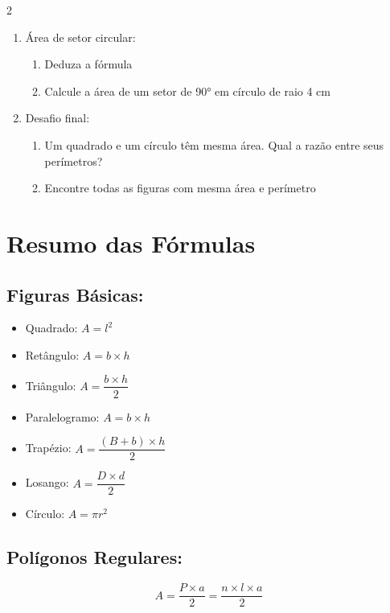 \documentclass[11pt]{article}
\begin{document}
\begin{multicols}{2}
\begin{enumerate}[leftmargin=*]
\begin{enumerate}[leftmargin=*, start=11]
\item Área de setor circular:

\begin{center}
\end{center}

\begin{enumerate}[label=\alph*)]
\item Deduza a fórmula
\item Calcule a área de um setor de 90° em círculo de raio 4 cm
\end{enumerate}

\item Desafio final:
\begin{enumerate}[label=\alph*)]
\item Um quadrado e um círculo têm mesma área. Qual a razão entre seus perímetros?
\item Encontre todas as figuras com mesma área e perímetro
\end{enumerate}

\end{enumerate}

\section*{Resumo das Fórmulas}

\subsection*{Figuras Básicas:}
\begin{itemize}
\item Quadrado: $A = l^2$
\item Retângulo: $A = b \times h$
\item Triângulo: $A = \dfrac{b \times h}{2}$
\item Paralelogramo: $A = b \times h$
\item Trapézio: $A = \dfrac{(B+b) \times h}{2}$
\item Losango: $A = \dfrac{D \times d}{2}$
\item Círculo: $A = \pi r^2$
\end{itemize}

\subsection*{Polígonos Regulares:}
\[
A = \frac{P \times a}{2} = \frac{n \times l \times a}{2}
\]


\end{enumerate}
\end{multicols}
\end{document}
